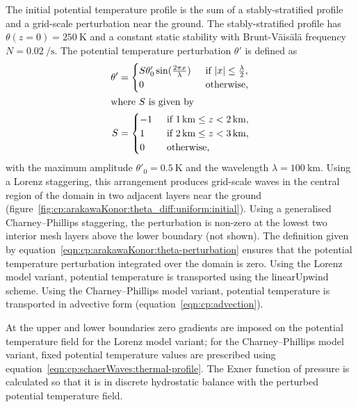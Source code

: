 The initial potential temperature profile is the sum of a stably-stratified profile and a grid-scale perturbation near the ground.
The stably-stratified profile has $\theta(z = 0) = \SI{250}{\kelvin}$ and a constant static stability with Brunt-V\"ais\"al\"a frequency $N = \SI{0.02}{\per\second}$.
The potential temperature perturbation $\theta'$ is defined as
\begin{subequations}
\label{eqn:cp:arakawaKonor:theta-perturbation}
\begin{align}
	\theta' &= \begin{cases}
		S \theta'_0 \sin(\frac{2 \pi x}{\lambda}) & \enskip \text{if $\left\lvert x \right\rvert \leq \frac{\lambda}{2}$,} \\
		0 & \enskip \text{otherwise,} \\
	\end{cases} \\
\shortintertext{where $S$ is given by}
	S &= \begin{cases}
		-1 & \enskip \text{if $\SI{1}{\kilo\meter} \leq z < \SI{2}{\kilo\meter}$,} \\
		1 & \enskip \text{if $\SI{2}{\kilo\meter} \leq z < \SI{3}{\kilo\meter}$,} \\
		0 & \enskip \text{otherwise,} \\
	\end{cases}
\end{align}%
\end{subequations}
with the maximum amplitude $\theta'_0 = \SI{0.5}{\kelvin}$ and the wavelength $\lambda = \SI{100}{\kilo\meter}$.
Using a Lorenz staggering, this arrangement produces grid-scale waves in the central region of the domain in two adjacent layers near the ground (figure~\ref{fig:cp:arakawaKonor:theta_diff:uniform:initial}).
Using a generalised Charney--Phillips staggering, the perturbation is non-zero at the lowest two interior mesh layers above the lower boundary (not shown).
The definition given by equation~\eqref{eqn:cp:arakawaKonor:theta-perturbation} ensures that the potential temperature perturbation integrated over the domain is zero.
Using the Lorenz model variant, potential temperature is transported using the linearUpwind scheme.
Using the Charney--Phillips model variant, potential temperature is transported in advective form (equation~\ref{eqn:cp:advection}).

At the upper and lower boundaries zero gradients are imposed on the potential temperature field for the Lorenz model variant; for the Charney--Phillips model variant, fixed potential temperature values are prescribed using equation~\ref{eqn:cp:schaerWaves:thermal-profile}.
The Exner function of pressure is calculated so that it is in discrete hydrostatic balance with the perturbed potential temperature field.

